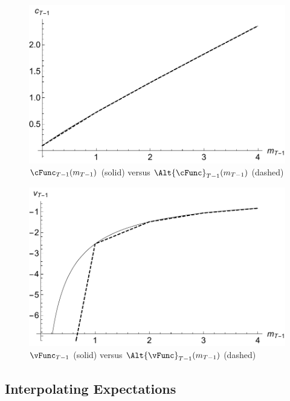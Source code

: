 \documentclass[titlepage]{\econtex}
\begin{document}
\hypertarget{PlotcTm1Simple}{}
\begin{figure}
  \includegraphics{./Figures/PlotcTm1Simple}
  \caption{$\cFunc_{T-1}({m}_{T-1})$ (solid) versus $\Alt{\cFunc}_{T-1}({m}_{T-1})$ (dashed)}
  \label{fig:PlotcTm1Simple}
\end{figure}

\hypertarget{PlotvTm1Simple}{}
\begin{figure}
  \includegraphics{./Figures/PlotVTm1Simple}
  \caption{$\vFunc_{T-1}$ (solid) versus $\Alt{\vFunc}_{T-1}({m}_{T-1})$ (dashed)}
  \label{fig:PlotVTm1Simple}
\end{figure}

\hypertarget{Interpolating-Expectations}{}
\subsection{Interpolating Expectations}

\end{document}
